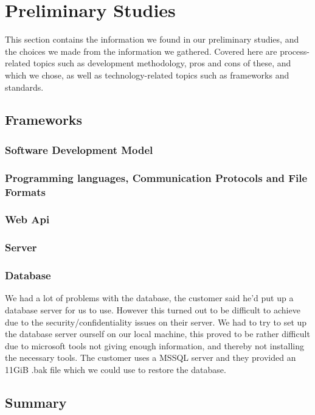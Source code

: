 \section{Preliminary Studies}
This section contains the information we found in our preliminary studies, and the choices we made from the information we gathered. Covered here are process-related topics such as development methodology, pros and cons of these, and which we chose, as well as technology-related topics such as frameworks and standards.

\subsection{Frameworks}
\subsubsection{Software Development Model}
\subsubsection{Programming languages, Communication Protocols and File Formats}
\subsubsection{Web Api}
\subsubsection{Server}
\subsubsection{Database}
We had a lot of problems with the database, the customer said he'd put up a database server for us to use. However this turned out to be difficult to achieve due to the security/confidentiality issues on their server. We had to try to set up the database server ourself on our local machine, this proved to be rather difficult due to microsoft tools not giving enough information, and thereby not installing the necessary tools.     
The customer uses a MSSQL server and they provided an 11GiB .bak file which we could use to restore the database.


\subsection{Summary}